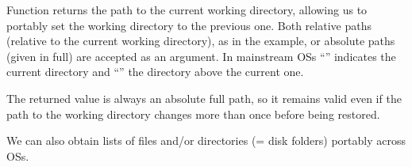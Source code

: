 \documentclass[krantz2]{krantz}\usepackage{knitr}
\begin{document}
\begin{knitrout}\footnotesize
{}\color{fgcolor}\begin{kframe}
\begin{alltt}
\hlstd{()}
\end{alltt}
\end{kframe}
\end{knitrout}

Function  returns the path to the current working directory, allowing us to portably set the working directory to the previous one. Both relative paths (relative to the current working directory), as in the example, or absolute paths (given in full) are accepted as an argument. In mainstream OSs ``'' indicates the current directory and ``'' the directory above the current one.

\begin{knitrout}\footnotesize
{}\color{fgcolor}\begin{kframe}
\begin{alltt}
 \hlkwb{<-} \hlstd{(}\hlstd{)}
\hlstd{()}
\end{alltt}
\end{kframe}
\end{knitrout}

The returned value is always an absolute full path, so it remains valid even if the path to the working directory changes more than once before being restored.

\begin{knitrout}\footnotesize
{}\color{fgcolor}\begin{kframe}
\begin{alltt}
\hlstd{()}
\end{alltt}
\end{kframe}
\end{knitrout}

We can also obtain lists of files and/or directories (= disk folders) portably across OSs.
\end{document}
